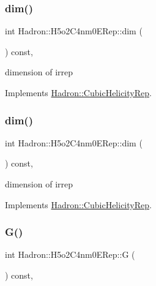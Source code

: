 \subsubsection{\texorpdfstring{dim()}{dim()}\hspace{0.1cm}{\footnotesize\ttfamily [1/2]}}
{\footnotesize\ttfamily int Hadron\+::\+H5o2\+C4nm0\+E\+Rep\+::dim (\begin{DoxyParamCaption}{ }\end{DoxyParamCaption}) const\hspace{0.3cm}{\ttfamily [inline]}, {\ttfamily [virtual]}}

dimension of irrep 

Implements \mbox{\hyperlink{structHadron_1_1CubicHelicityRep_a95d229a05580e65f8bdde74a1e316855}{Hadron\+::\+Cubic\+Helicity\+Rep}}.

\mbox{\label{structHadron_1_1H5o2C4nm0ERep_a0f02fe46b046e8aa23d25931a87505d6}} 
\subsubsection{\texorpdfstring{dim()}{dim()}\hspace{0.1cm}{\footnotesize\ttfamily [2/2]}}
{\footnotesize\ttfamily int Hadron\+::\+H5o2\+C4nm0\+E\+Rep\+::dim (\begin{DoxyParamCaption}{ }\end{DoxyParamCaption}) const\hspace{0.3cm}{\ttfamily [inline]}, {\ttfamily [virtual]}}

dimension of irrep 

Implements \mbox{\hyperlink{structHadron_1_1CubicHelicityRep_a95d229a05580e65f8bdde74a1e316855}{Hadron\+::\+Cubic\+Helicity\+Rep}}.

\mbox{\label{structHadron_1_1H5o2C4nm0ERep_a9dfac60bb29f12f13f0672f303630db6}} 
\subsubsection{\texorpdfstring{G()}{G()}\hspace{0.1cm}{\footnotesize\ttfamily [1/2]}}
{\footnotesize\ttfamily int Hadron\+::\+H5o2\+C4nm0\+E\+Rep\+::G (\begin{DoxyParamCaption}{ }\end{DoxyParamCaption}) const\hspace{0.3cm}{\ttfamily [inline]}, {\ttfamily [virtual]}}

